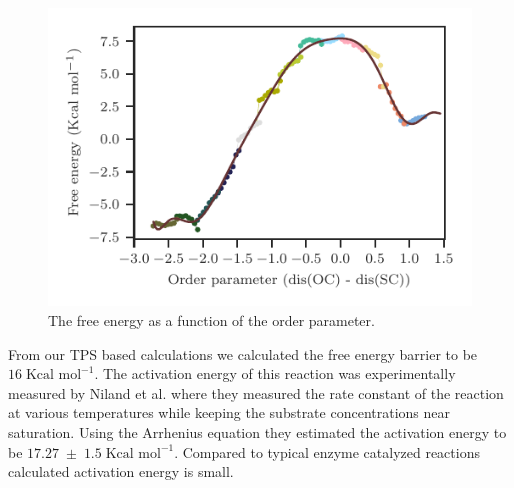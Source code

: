\documentclass[journal=jpcbfk,manuscript=article,layout=traditional]{achemso}
\begin{document}
\begin{figure}
\includegraphics[scale=1.0]{figures/mat2a-fenergy.pdf}
\caption{The free energy as a function of the order parameter.}
\end{figure}
From our TPS based calculations we calculated the free energy barrier to be 
$16\;\text{Kcal mol}^{-1}$.
The activation energy of this reaction was experimentally measured by 
Niland et al. \cite{Niland21Biochem60p791} where they measured the rate 
constant of the reaction at various temperatures while keeping the 
substrate concentrations near saturation. Using the Arrhenius equation 
they estimated the activation energy to be $17.27\;\pm\;1.5\;
\text{Kcal mol}^{-1}$. Compared to typical enzyme catalyzed 
reactions calculated activation energy is small.  
\end{document}
